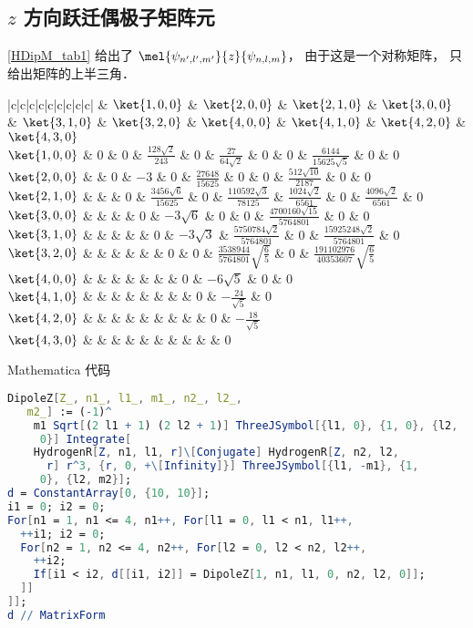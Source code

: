 

\subsection{$z$ 方向跃迁偶极子矩阵元}
\autoref{HDipM_tab1} 给出了 $\mel{\psi_{n',l',m'}}{z}{\psi_{n,l,m}}$， 由于这是一个对称矩阵， 只给出矩阵的上半三角．
\begin{table}[ht]
\centering
\caption{$\mel{\psi_{n',l',m'}}{z}{\psi_{n,l,m}}$}\label{HDipM_tab1}
\begin{tabular}{|c|c|c|c|c|c|c|c|c|}
\hline
& $\ket{1,0,0}$ & $\ket{2,0,0}$ & $\ket{2,1,0}$ & $\ket{3,0,0}$ & $\ket{3,1,0}$ & $\ket{3,2,0}$ & $\ket{4,0,0}$ &  $\ket{4,1,0}$ & $\ket{4,2,0}$ & $\ket{4,3,0}$ \\
\hline
$\ket{1,0,0}$ & 0 & 0 & $\frac{128\sqrt 2}{243}$ & 0 & $\frac{27}{64\sqrt 2}$ & 0 & 0 & $\frac{6144}{15625 \sqrt 5}$ & 0 & 0\\
\hline
$\ket{2,0,0}$ &  & 0 & $-3$ & 0 & $\frac{27648}{15625}$ & 0 & 0 & $\frac{512\sqrt{10}}{2187}$ & 0 & 0 \\
\hline
$\ket{2,1,0}$ &  &  & 0 & $\frac{3456\sqrt 6}{15625}$ & 0 & $\frac{110592\sqrt 3}{78125}$ & $\frac{1024\sqrt 2}{6561}$ & 0 & $\frac{4096\sqrt 2}{6561}$ & 0\\
\hline
$\ket{3,0,0}$ &  &  &  & 0 & $-3\sqrt 6$ & 0 & 0 & $\frac{4700160 \sqrt{15}}{5764801}$ & 0 & 0\\
\hline
$\ket{3,1,0}$ &  &  &  & & 0 & $-3 \sqrt 3$ & $\frac{5750784 \sqrt 2}{5764801}$ & 0 & $\frac{15925248 \sqrt 2}{5764801}$ & 0\\
\hline
$\ket{3,2,0}$ &  &  &  &  &  & 0 & 0 & $\frac{3538944}{5764801}\sqrt{\frac 65}$ & 0 & $\frac{191102976}{40353607}\sqrt{\frac 65}$ \\
\hline
$\ket{4,0,0}$ &  &  &  &  &  &  & 0 & $-6\sqrt 5$ & 0 & 0 \\
\hline
$\ket{4,1,0}$ &  &  &  &  &  &  &  & 0 & $-\frac{24}{\sqrt 5}$ & 0\\
\hline
$\ket{4,2,0}$ &  &  &  &  &  &  &  &  & 0 & $-\frac{18}{\sqrt 5}$ \\
\hline
$\ket{4,3,0}$ &  &  &  &  &  &  &  &  &  & 0\\
\hline
\end{tabular}
\end{table}

Mathematica 代码
\begin{lstlisting}[language=Mathematica]
DipoleZ[Z_, n1_, l1_, m1_, n2_, l2_, 
   m2_] := (-1)^
    m1 Sqrt[(2 l1 + 1) (2 l2 + 1)] ThreeJSymbol[{l1, 0}, {1, 0}, {l2, 
     0}] Integrate[
    HydrogenR[Z, n1, l1, r]\[Conjugate] HydrogenR[Z, n2, l2, 
      r] r^3, {r, 0, +\[Infinity]}] ThreeJSymbol[{l1, -m1}, {1, 
     0}, {l2, m2}];
d = ConstantArray[0, {10, 10}];
i1 = 0; i2 = 0;
For[n1 = 1, n1 <= 4, n1++, For[l1 = 0, l1 < n1, l1++,
  ++i1; i2 = 0;
  For[n2 = 1, n2 <= 4, n2++, For[l2 = 0, l2 < n2, l2++,
    ++i2;
    If[i1 < i2, d[[i1, i2]] = DipoleZ[1, n1, l1, 0, n2, l2, 0]];
  ]]
]];
d // MatrixForm
\end{lstlisting}
